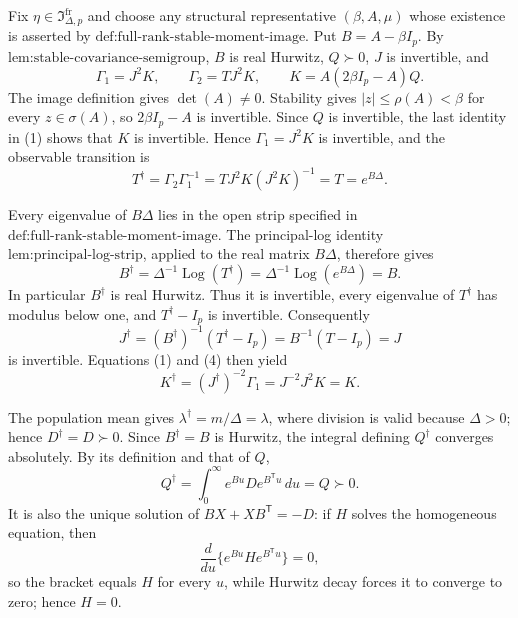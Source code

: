 Fix \(\eta\in\mathfrak I_{\Delta,p}^{\mathrm{fr}}\) and choose any structural representative \((\beta,A,\mu)\) whose existence is asserted by \(\text{def:full-rank-stable-moment-image}\).  Put \(B=A-\beta I_p\).  By \(\text{lem:stable-covariance-semigroup}\), \(B\) is real Hurwitz, \(Q\succ0\), \(J\) is invertible, and
\[
 \Gamma_1=J^2K,\qquad \Gamma_2=TJ^2K,\qquad
 K=A(2\beta I_p-A)Q.
\tag{1}
\]
The image definition gives \(\det(A)\neq0\).  Stability gives \(|z|\leq\rho(A)<\beta\) for every \(z\in\sigma(A)\), so \(2\beta I_p-A\) is invertible.  Since \(Q\) is invertible, the last identity in (1) shows that \(K\) is invertible.  Hence \(\Gamma_1=J^2K\) is invertible, and the observable transition is
\[
 T^\dagger=\Gamma_2\Gamma_1^{-1}
 =TJ^2K(J^2K)^{-1}=T=e^{B\Delta}.
\tag{2}
\]

Every eigenvalue of \(B\Delta\) lies in the open strip specified in \(\text{def:full-rank-stable-moment-image}\).  The principal-log identity \(\text{lem:principal-log-strip}\), applied to the real matrix \(B\Delta\), therefore gives
\[
 B^\dagger=\Delta^{-1}\operatorname{Log}(T^\dagger)
 =\Delta^{-1}\operatorname{Log}(e^{B\Delta})=B.
\tag{3}
\]
In particular \(B^\dagger\) is real Hurwitz.  Thus it is invertible, every eigenvalue of \(T^\dagger\) has modulus below one, and \(T^\dagger-I_p\) is invertible.  Consequently
\[
 J^\dagger=(B^\dagger)^{-1}(T^\dagger-I_p)
 =B^{-1}(T-I_p)=J
\tag{4}
\]
is invertible.  Equations (1) and (4) then yield
\[
 K^\dagger=(J^\dagger)^{-2}\Gamma_1=J^{-2}J^2K=K.
\tag{5}
\]

The population mean gives \(\lambda^\dagger=m/\Delta=\lambda\), where division is valid because \(\Delta>0\); hence \(D^\dagger=D\succ0\).  Since \(B^\dagger=B\) is Hurwitz, the integral defining \(Q^\dagger\) converges absolutely.  By its definition and that of \(Q\),
\[
 Q^\dagger=\int_0^\infty e^{Bu}De^{B^{\mathsf T}u}\,du=Q\succ0.
\tag{6}
\]
It is also the unique solution of \(BX+XB^{\mathsf T}=-D\): if \(H\) solves the homogeneous equation, then
\[
 \frac{d}{du}\{e^{Bu}He^{B^{\mathsf T}u}\}=0,
\]
so the bracket equals \(H\) for every \(u\), while Hurwitz decay forces it to converge to zero; hence \(H=0\).

